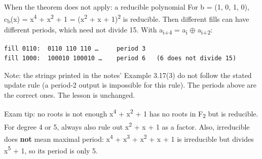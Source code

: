 \documentclass[11pt,a4paper]{article}
\begin{document}
\begin{trap}{When the theorem does not apply: a reducible polynomial}
For b = (1, 0, 1, 0), c\textsubscript{b}(x) = x\textsuperscript{4} + x\textsuperscript{2} + 1 = (x\textsuperscript{2} + x + 1)\textsuperscript{2} is reducible. Then different fills can have different periods, which need not divide 15. With a\textsubscript{i+4} = a\textsubscript{i} \ensuremath{\oplus} a\textsubscript{i+2}:\par
\begin{workbox}
\begin{Verbatim}[commandchars=\\\{\},fontsize=\footnotesize]
fill 0110:  0110 110 110 …     period 3
fill 1000:  100010 100010 …    period 6   (6 does not divide 15)
\end{Verbatim}
\end{workbox}
{\small\color{black!70} Note: the strings printed in the notes' Example 3.17(3) do not follow the stated update rule (a period-2 output is impossible for this rule). The periods above are the correct ones. The lesson is unchanged.}\par
\end{trap}
\begin{tip}{Exam tip: no roots is not enough}
x\textsuperscript{4} + x\textsuperscript{2} + 1 has no roots in F\textsubscript{2} but is reducible. For degree 4 or 5, always also rule out x\textsuperscript{2} + x + 1 as a factor. Also, irreducible does \textbf{not} mean maximal period: x\textsuperscript{4} + x\textsuperscript{3} + x\textsuperscript{2} + x + 1 is irreducible but divides x\textsuperscript{5} + 1, so its period is only 5.\par
\end{tip}
\end{document}
